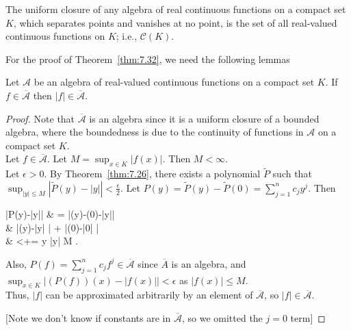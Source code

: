 \begin{thm}
	The uniform closure of any algebra of real continuous functions on a compact set $K$, which separates points and vanishes at no point, is the set of all real-valued continuous functions on $K$; i.e., $\mathscr{C}(K)$.
\end{thm}
For the proof of Theorem~\ref{thm:7.32}, we need the following lemmas
\begin{lemma}[1]
	\label{lem:7.32a}
	Let $\mathscr{A}$ be an algebra of real-valued continuous functions on a compact set $K$. If $f \in \overline{\mathscr{A}}$ then $\left|f\right| \in \overline{\mathscr{A}}$.
	\begin{proof}
		Note that $\overline{\mathscr{A}}$ is an algebra since it is a uniform closure of a bounded algebra, where the boundedness is due to the continuity of functions in $\mathscr{A}$ on a compact set $K$.\\
		Let $f \in \overline{\mathscr{A}}$. Let $M=\sup_{x \in K} \left|f(x)\right| $. Then $M<\infty$.\\
		Let $\epsilon>0$. By Theorem~\ref{thm:7.26}, there exists a polynomial $\tilde{P}$ such that $\sup_{\left|y\right| \le M} \left|\tilde{P}(y)-\left|y\right| \right| <\frac{\epsilon}{2}$.
		Let $P(y)=\tilde{P}(y)-\tilde{P}(0)= \sum_{j=1}^{n}{c_jy^{j}}$.
		Then
		\begin{flalign*}
			\left|P(y)-\left|y\right|\right| & = \left|\tilde{P}(y)-(0)-\left|y\right|\right|                                                     \\
			                                 & \le \left|(y)-\left|y\right| \right| + \left|(0)-\left|0\right| \right|                   \\
			                                 & <+=\epsilon {} y  \left|y\right|  \le M
			.\end{flalign*}
		Also, $P(f)=\sum_{j=1}^{n}{c_{j}f^{j}} \in \overline{\mathscr{A}}$ since $\overline{A}$ is an algebra, and $\sup_{x \in K}\left|(P(f))(x)-\left|f(x)\right| \right| <\epsilon$ as $\left|f(x)\right| \le M$.\\
		Thus, $\left|f\right| $ can be approximated arbitrarily by an element of $\overline{\mathscr{A}}$, so $\left|f\right| \in \overline{\mathscr{A}}$.

		[Note we don't know if constants are in $\overline{\mathscr{A}}$, so we omitted the $j=0$ term]
	\end{proof}
\end{lemma}
